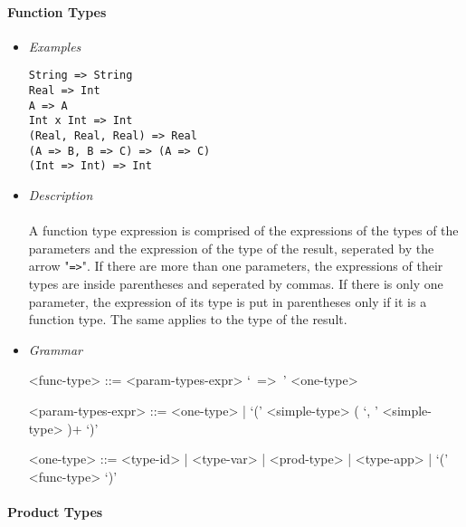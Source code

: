 \documentclass{article}
\begin{document}
\paragraph{Function Types}

\begin{itemize}
\item \textit{Examples}
\begin{verbatim}
String => String 
Real => Int
A => A
Int x Int => Int
(Real, Real, Real) => Real
(A => B, B => C) => (A => C)
(Int => Int) => Int
\end{verbatim}

\item \textit{Description} \\\\
A function type expression is comprised of the expressions of the types of the
parameters and the expression of the type of the result, seperated by the arrow
"\texttt{=>}". If there are more than one parameters, the expressions of their
types are inside parentheses and seperated by commas. If there is only one
parameter, the expression of its type is put in parentheses only if it is 
a function type. The same applies to the type of the result.

\item \textit{Grammar}
\begin{grammar}
<func-type> ::= <param-types-expr> `\ =>\ ' <one-type>

<param-types-expr> ::= <one-type> | `(' <simple-type> ( `, ' <simple-type> )+ `)'

<one-type> ::=
<type-id> | <type-var> | <prod-type> | <type-app> | `(' <func-type> `)'
\end{grammar}
\end{itemize}

\paragraph{Product Types}
\end{document}
